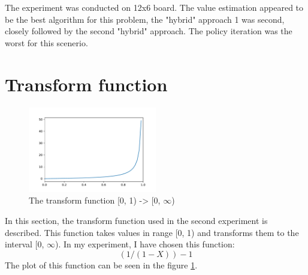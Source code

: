 \documentclass[10pt,journal,compsoc,twoside]{IEEEtran}
\begin{document}
The experiment was conducted on 12x6 board. The value estimation appeared to be the best algorithm for this problem,
the "hybrid" approach 1 was second, closely followed by the second "hybrid" approach. The policy iteration was the worst for this scenerio. 

\appendices
\section{Transform function}\label{sec:transform_function}

\begin{figure}
    \caption{The transform function [0, 1) -> [0, $\infty$)}
    \label{fig:e2transform}
        \includegraphics[width=0.5\textwidth, angle=0]{figures/e2_trans.pdf}
\end{figure}

In this section, the transform function used in the second experiment is described.
This function takes values in range [0, 1) and transforms them to the interval [0, $\infty$).
In my experiment, I have chosen this function:
\begin{equation}
    (1 / (1 - X)) - 1
\end{equation}
The plot of this function can be seen in the figure \ref{fig:e2transform}.
\end{document}
